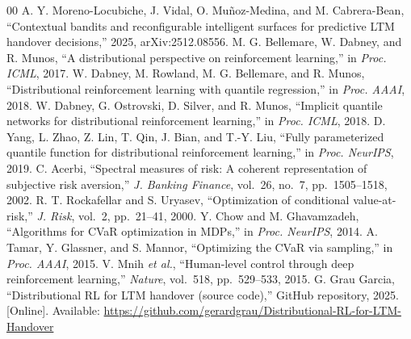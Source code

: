 \documentclass[conference]{IEEEtran}
\begin{document}
\begin{thebibliography}{00}
 A. Y. Moreno-Locubiche, J. Vidal, O. Mu\~{n}oz-Medina, and M. Cabrera-Bean, ``Contextual bandits and reconfigurable intelligent surfaces for predictive LTM handover decisions,'' 2025, arXiv:2512.08556.
 M. G. Bellemare, W. Dabney, and R. Munos, ``A distributional perspective on reinforcement learning,'' in \emph{Proc. ICML}, 2017.
 W. Dabney, M. Rowland, M. G. Bellemare, and R. Munos, ``Distributional reinforcement learning with quantile regression,'' in \emph{Proc. AAAI}, 2018.
 W. Dabney, G. Ostrovski, D. Silver, and R. Munos, ``Implicit quantile networks for distributional reinforcement learning,'' in \emph{Proc. ICML}, 2018.
 D. Yang, L. Zhao, Z. Lin, T. Qin, J. Bian, and T.-Y. Liu, ``Fully parameterized quantile function for distributional reinforcement learning,'' in \emph{Proc. NeurIPS}, 2019.
 C. Acerbi, ``Spectral measures of risk: A coherent representation of subjective risk aversion,'' \emph{J. Banking Finance}, vol.~26, no.~7, pp.~1505--1518, 2002.
 R. T. Rockafellar and S. Uryasev, ``Optimization of conditional value-at-risk,'' \emph{J. Risk}, vol.~2, pp.~21--41, 2000.
 Y. Chow and M. Ghavamzadeh, ``Algorithms for CVaR optimization in MDPs,'' in \emph{Proc. NeurIPS}, 2014.
 A. Tamar, Y. Glassner, and S. Mannor, ``Optimizing the CVaR via sampling,'' in \emph{Proc. AAAI}, 2015.
 V. Mnih \emph{et al.}, ``Human-level control through deep reinforcement learning,'' \emph{Nature}, vol.~518, pp.~529--533, 2015.
 G. Grau Garcia, ``Distributional RL for LTM handover (source code),'' GitHub repository, 2025. [Online]. Available: \url{https://github.com/gerardgrau/Distributional-RL-for-LTM-Handover}
\end{thebibliography}
\end{document}
